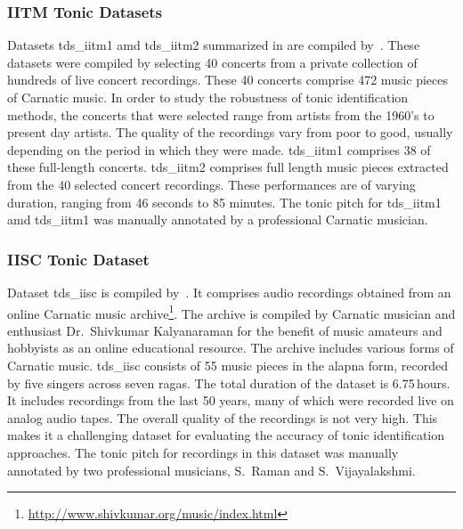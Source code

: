 {

\subsubsection{IITM Tonic Datasets}
\label{sec:corpus_iitm_tonic_datasets}

Datasets \acrshort{tds_iitm1} amd \acrshort{tds_iitm2} summarized in  are compiled by~\cite{bellur2012knowledge}. These datasets were compiled by selecting 40 concerts from a private collection of hundreds of live concert recordings. These 40 concerts comprise 472 music pieces of Carnatic music. In order to study the robustness of tonic identification methods, the concerts that were selected range from artists from the 1960's to present day artists. The quality of the recordings vary from poor to good, usually depending on the period in which they were made. \acrshort{tds_iitm1} comprises 38 of these full-length concerts. \acrshort{tds_iitm2} comprises full length music pieces extracted from the 40 selected concert recordings. These performances are of varying duration, ranging from 46 seconds to 85 minutes. The tonic pitch for \acrshort{tds_iitm1} amd \acrshort{tds_iitm1} was manually annotated by a professional Carnatic musician.


\subsubsection{IISC Tonic Dataset}
\label{sec:corpus_iisc_tonic_dataset}

Dataset \acrshort{tds_iisc} is compiled by~\cite{ranjani2011carnatic}. It comprises audio recordings obtained from an online Carnatic music archive\footnote{\url{http://www.shivkumar.org/music/index.html}}. The archive is compiled by Carnatic musician and enthusiast Dr.~Shivkumar Kalyanaraman for the benefit of music amateurs and hobbyists as an online educational resource. The archive includes various forms of Carnatic music. \acrshort{tds_iisc} consists of 55 music pieces in the \gls{alapna} form, recorded by five singers across seven \glspl{raga}. The total duration of the dataset is 6.75\,hours. It includes recordings from the last 50 years, many of which were recorded live on analog audio tapes. The overall quality of the recordings is not very high. This makes it a challenging dataset for evaluating the accuracy of tonic identification approaches. The tonic pitch for recordings in this dataset was manually annotated by two professional musicians, S.~Raman and S.~Vijayalakshmi.


}
